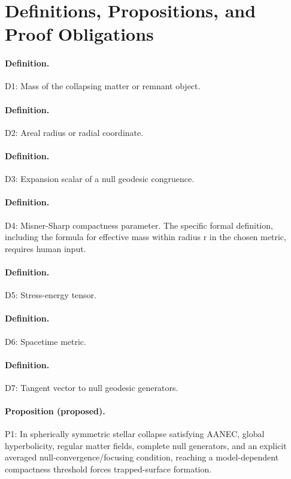 \documentclass[conference]{IEEEtran}
\begin{document}
\section{Definitions, Propositions, and Proof Obligations}
\paragraph{Definition.} D1: Mass of the collapsing matter or remnant object.

\paragraph{Definition.} D2: Areal radius or radial coordinate.

\paragraph{Definition.} D3: Expansion scalar of a null geodesic congruence.

\paragraph{Definition.} D4: Misner-Sharp compactness parameter. The specific formal definition, including the formula for effective mass within radius r in the chosen metric, requires human input.

\paragraph{Definition.} D5: Stress-energy tensor.

\paragraph{Definition.} D6: Spacetime metric.

\paragraph{Definition.} D7: Tangent vector to null geodesic generators.

\paragraph{Proposition (proposed).} P1: In spherically symmetric stellar collapse satisfying AANEC, global hyperbolicity, regular matter fields, complete null generators, and an explicit averaged null-convergence/focusing condition, reaching a model-dependent compactness threshold forces trapped-surface formation.
\end{document}
